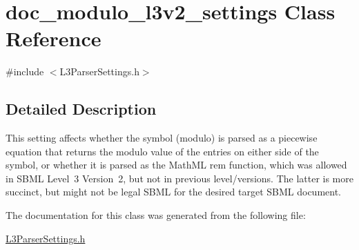\hypertarget{classdoc__modulo__l3v2__settings}{}\section{doc\+\_\+modulo\+\_\+l3v2\+\_\+settings Class Reference}
\label{classdoc__modulo__l3v2__settings}


{\ttfamily \#include $<$L3\+Parser\+Settings.\+h$>$}



\subsection{Detailed Description}
\begin{DoxyParagraph}{}
This setting affects whether the \textquotesingle{}\textquotesingle{} symbol (modulo) is parsed as a piecewise equation that returns the modulo value of the entries on either side of the symbol, or whether it is parsed as the Math\+ML \textquotesingle{}rem\textquotesingle{} function, which was allowed in S\+B\+ML Level~3 Version~2, but not in previous level/versions. The latter is more succinct, but might not be legal S\+B\+ML for the desired target S\+B\+ML document. 
\end{DoxyParagraph}


The documentation for this class was generated from the following file\+:\begin{DoxyCompactItemize}
\item 
\hyperlink{_l3_parser_settings_8h}{L3\+Parser\+Settings.\+h}\end{DoxyCompactItemize}
